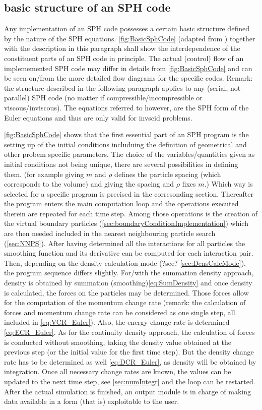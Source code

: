 \documentclass{report}
\begin{document}
\subsection{basic structure of an SPH code}

Any implementation of an SPH code possesses a certain basic structure defined by the nature of the SPH equations. \ref{fig:BasicSphCode} (adapted from \cite{Liu2003}) together with the description in this paragraph shall show the interdependence of the constituent parts of an SPH code in principle. The actual (control) flow of an implememented SPH code may differ in details from \ref{fig:BasicSphCode} and can be seen on/from the more detailed flow diagrams for the specific codes.
Remark: the structure described in the following paragraph applies to any (serial, not parallel) SPH code (no matter if compressible/incompressible or viscous/inviscous). The equations referred to however, are the SPH form of the Euler equations and thus are only valid for invscid problems.

\ref{fig:BasicSphCode} shows that the first essential part of an SPH program is the setting up of the initial conditions includuing the definition of geometrical and other probem specific parameters. The choice of the variables/quantities given as initial conditions not being unique, there are several possibilities in defining them. (for example giving $m$ and $\rho$ defines the particle spacing (which corresponds to the volume) and giving the spacing and $\rho$ fixes $m$.) Which way is selected for a specific program is precised in the corresonding section. 
Thereafter the program enters the main computation loop and the operations executed therein are repeated for each time step. Among those operations is the creation of the virtual boundary particles (\ref{sec:boundaryConditionImplementation}) which are then needed included in the nearest neighbouring particle search (\ref{sec:NNPS}). After having determined all the interactions for all particles the smoothing function and its derivative can be computed for each interaction pair. Then, depending on the density calculation mode (?see? \ref{sec:DensCalcMode}), the program sequence differs slightly. 
For/with the summation density approach, density is obtained by summation (smoothing)\ref{eq:SumDensity} and once density is calculated, the forces on the particles may be determined. Those forces allow for the computation of the momentum change rate (remark: the calculation of forces and momentum change rate can be considered as one single step, all included in \ref{eq:VCR_Euler}). Also, the energy change rate is determined \ref{eq:ECR_Euler}.
As for the continuity density approach, the calculation of forces is conducted without smoothing, taking the density value obtained at the previous step (or the initial value for the first time step). But the density change rate has to be determined as well \ref{eq:DCR_Euler}, as density will be obtained by integration. 
Once all necessary change rates are known, the values can be updated to the next time step, see \ref{sec:numIntegr} and the loop can be restarted. After the actual simulation is finished, an output module is in charge of making data available in a form (that is) exploitable to the user.
\end{document}
